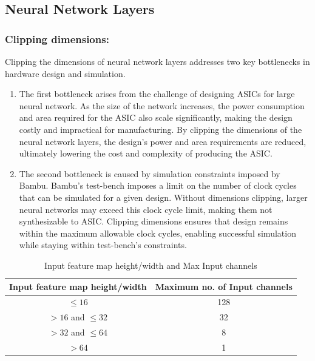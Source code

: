 \subsection{Neural Network Layers}

\subsubsection{Clipping dimensions:}

Clipping the dimensions of neural network layers addresses two key bottlenecks in hardware design and simulation.
\begin{enumerate}
    \item The first bottleneck arises from the challenge of designing ASICs for large neural network. As the size of the network increases, the power consumption and area required for the ASIC also scale significantly, making the design costly and impractical for manufacturing. By clipping the dimensions of the neural network layers, the design's power and area requirements are reduced, ultimately lowering the cost and complexity of producing the ASIC.
    \item The second bottleneck is caused by simulation constraints imposed by Bambu. Bambu's test-bench imposes a limit on the number of clock cycles that can be simulated for a given design. Without dimensions clipping, larger neural networks may exceed this clock cycle limit, making them not synthesizable to ASIC. Clipping dimensions ensures that design remains within the maximum allowable clock cycles, enabling successful simulation while staying within test-bench's constraints.
\end{enumerate}

\begin{table}[H]
\caption{Input feature map height/width and Max Input channels}
\label{tab:clipInput}
\centering
\begin{tabular}{|c|c|}
\hline
\textbf{Input feature map height/width} & \textbf{Maximum no. of Input channels} \\ \hline
$\leq 16$ & 128 \\ \hline
$> 16$ and $\leq 32$ & 32 \\ \hline
$> 32$ and $\leq 64$ & 8 \\ \hline
$> 64$ & 1 \\ \hline
\end{tabular}
\end{table}

